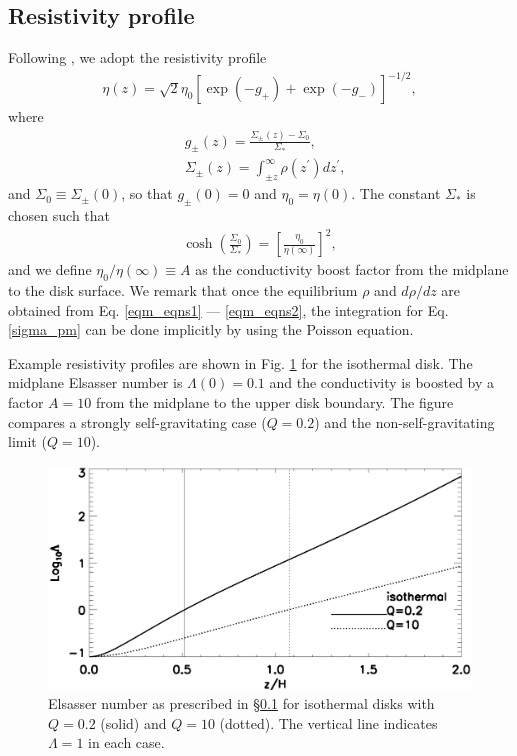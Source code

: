 \subsection{Resistivity profile}\label{resis_profile}
Following \cite{fleming03}, we adopt the resistivity profile
\begin{align}
  \eta(z) =
  \sqrt{2}\eta_0\left[\exp{\left(-g_+\right)}+\exp{\left(-g_-\right)}\right]^{-1/2},  
\end{align}
where
\begin{align}
  &g_\pm(z) =  \frac{\Sigma_\pm(z)-\Sigma_0}{\Sigma_*}, \\
  &\Sigma_\pm(z) = \int_{\pm z}^\infty\rho(z^\prime)dz^\prime, \label{sigma_pm}
\end{align}
and $\Sigma_0\equiv\Sigma_{\pm}(0)$, so that $g_\pm(0)=0$ and $\eta_0 
= \eta(0)$. The constant $\Sigma_*$ is chosen such that 
\begin{align}
  \cosh{\left(\frac{\Sigma_0}{\Sigma_*}\right)} =
  \left[\frac{\eta_0}{\eta(\infty)}\right]^2,
\end{align}
and we define $\eta_0/\eta(\infty)\equiv A$ as the conductivity
boost factor from the midplane to the disk surface. We remark that
once the equilibrium $\rho$ and $d\rho/dz$ are obtained from
Eq. \ref{eqm_eqns1} --- \ref{eqm_eqns2}, the integration for
Eq. \ref{sigma_pm} can be done implicitly by using the Poisson
equation. 

Example resistivity profiles are shown in Fig. \ref{eqm_resis} for the isothermal disk. 
The midplane Elsasser number is $\Lambda(0)=0.1$ and the conductivity is boosted by a factor $A=10$ 
from the midplane to the upper disk boundary. The figure compares a strongly self-gravitating case
($Q=0.2$) and the non-self-gravitating limit ($Q=10$). 


\begin{figure}
  \includegraphics[width=\linewidth]{figures/elsasser_iso}
  \caption{Elsasser number as prescribed in \S\ref{resis_profile} for
    isothermal disks with $Q=0.2$ (solid) 
    and $Q=10$ (dotted). The vertical line
    indicates $\Lambda=1$ in each case. \label{eqm_resis}}
\end{figure}




